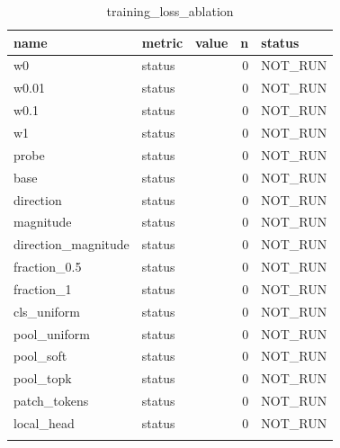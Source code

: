 \begin{table}
\centering
\begin{tabular}{llrrl}
name & metric & value & n & status \\
\hline
w0 & status &  & 0 & NOT\_RUN \\
w0.01 & status &  & 0 & NOT\_RUN \\
w0.1 & status &  & 0 & NOT\_RUN \\
w1 & status &  & 0 & NOT\_RUN \\
probe & status &  & 0 & NOT\_RUN \\
base & status &  & 0 & NOT\_RUN \\
direction & status &  & 0 & NOT\_RUN \\
magnitude & status &  & 0 & NOT\_RUN \\
direction\_magnitude & status &  & 0 & NOT\_RUN \\
fraction\_0.5 & status &  & 0 & NOT\_RUN \\
fraction\_1 & status &  & 0 & NOT\_RUN \\
cls\_uniform & status &  & 0 & NOT\_RUN \\
pool\_uniform & status &  & 0 & NOT\_RUN \\
pool\_soft & status &  & 0 & NOT\_RUN \\
pool\_topk & status &  & 0 & NOT\_RUN \\
patch\_tokens & status &  & 0 & NOT\_RUN \\
local\_head & status &  & 0 & NOT\_RUN \\
\caption{training\_loss\_ablation}
\end{tabular}
\end{table}
